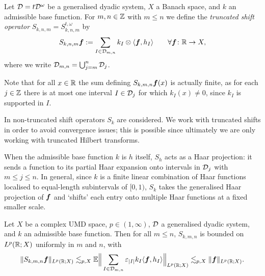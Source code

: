 
\begin{defn}
  Let $\mathcal{D} = t\mathcal{D}^{\omega}$ be a generalised dyadic system, $X$ a Banach space, and $k$ an admissible base function.
  For $m,n \in \mathbb{Z}$ with $m \leq n$ we define the \emph{truncated shift operator} $S_{k,n,m} = S_{k,n,m}^{t,\omega}$ by
  \begin{equation*}
    S_{k,n,m} \bm{f} := \sum_{I \in \mathcal{D}_{m,n}} k_{I} \otimes \langle \bm{f}, h_{I} \rangle \qquad \forall \bm{f} \colon \mathbb{R} \rightarrow X,
  \end{equation*}
  where we write $\mathcal{D}_{m,n} = \bigcup_{j = m}^{n} \mathcal{D}_{j}$.
\end{defn}

Note that for all $x \in \mathbb{R}$ the sum defining $S_{k,m,n}\bm{f}(x)$ is actually finite, as for each $j \in \mathbb{Z}$ there is at most one interval $I \in \mathcal{D}_{j}$ for which $k_{I}(x) \neq 0$, since $k_{I}$ is supported in $I$.

\begin{rmk}
  In \cite{HNVW16} non-truncated shift operators $S_{k}$ are considered.
  We work with truncated shifts in order to avoid convergence issues; this is possible since ultimately we are only working with truncated Hilbert transforms.
\end{rmk}

When the admissible base function $k$ is $h$ itself, $S_{h}$ acts as a Haar projection: it sends a function to its partial Haar expansion onto intervals in $\mathcal{D}_{j}$ with $m \leq j \leq n$.
In general, since $k$ is a finite linear combination of Haar functions localised to equal-length subintervals of $[0,1)$, $S_{k}$ takes the generalised Haar projection of $\bm{f}$ and `shifts' each entry onto multiple Haar functions at a fixed smaller scale.

\begin{thm}\label{eq:shift-boundedness}
  Let $X$ be a complex UMD space, $p \in (1,\infty)$, $\mathcal{D}$ a generalised dyadic system, and $k$ an admissible base function.
  Then for all $m \leq n$, $S_{k,m,n}$ is bounded on $L^{p}(\mathbb{R};X)$ uniformly in $m$ and $n$,
  with
  \begin{equation*}
    \|S_{k,m,n} \bm{f}\|_{L^p(\mathbb{R};X)} \lesssim_{p,X} \mathbb{E} \Big\| \sum_{I \in \mathcal{D}_{m,n}} \varepsilon_{|I|} k_{I} \langle \bm{f}, h_{I} \rangle \Big\|_{L^p(\mathbb{R};X)} \lesssim_{p,X} \|\bm{f}\|_{L^p(\mathbb{R};X)}.
  \end{equation*}
\end{thm}


